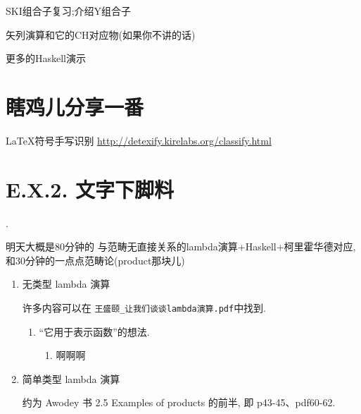 \documentclass{article}
\begin{document}
SKI组合子复习;介绍Y组合子

矢列演算和它的CH对应物(如果你不讲的话)

更多的Haskell演示

\section*{瞎鸡儿分享一番}

\LaTeX 符号手写识别 \url{http://detexify.kirelabs.org/classify.html}

\section*{E.X.2. 文字下脚料}
.

明天大概是80分钟的 与范畴无直接关系的lambda演算+Haskell+柯里霍华德对应, 
和30分钟的一点点范畴论(product那块儿)

\begin{enumerate}
	\item 无类型 lambda 演算
	
	许多内容可以在 \verb!王盛颐_让我们谈谈lambda演算.pdf!中找到.
	\begin{enumerate}
		\item “它用于表示函数”的想法. 
		\begin{enumerate}
			\item 啊啊啊
		\end{enumerate}
	\end{enumerate}
	
	
	\item 简单类型 lambda 演算
	
	约为 Awodey 书 2.5 Examples of products 的前半, 即 p43-45、pdf60-62.
\end{enumerate}	
\end{document}
